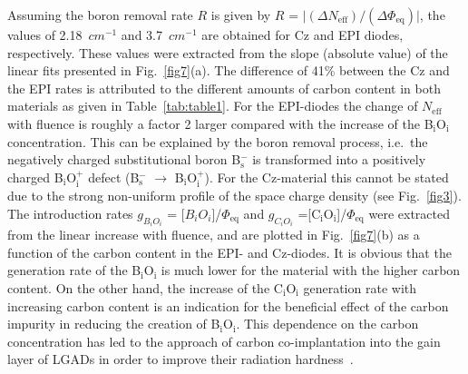 \documentclass[final, 5p, times]{elsarticle}
\begin{document}
Assuming the boron removal rate $R$ is given by $R$ = $\lvert (\Delta N_\text{eff})/ (\Delta \Phi_\text{eq}) \rvert$, the values of 2.18~$\si{cm^{-1}}$ and 3.7~$\si{cm^{-1}}$ are obtained for Cz and EPI diodes, respectively. These values were extracted from the slope (absolute value) of the linear fits presented in Fig.~\ref{fig7}(a). The difference of 41\% between the Cz and the EPI rates is attributed to the different amounts of carbon content in both materials as given in Table~\ref{tab:table1}. For the EPI-diodes the change of $N_\text{eff}$ with fluence is roughly a factor 2 larger compared with the increase of the B$_\text{i}$O$_\text{i}$ concentration. This can be explained by the boron removal process, i.e.\ the negatively charged substitutional boron B$^{-}_\text{s}$ is transformed into a positively charged B$_\text{i}$O$^{+}_\text{i}$ defect (B$^{-}_\text{s}$ $\rightarrow$ B$_\text{i}$O$^{+}_\text{i}$). For the Cz-material this cannot be stated due to the strong non-uniform profile of the space charge density (see Fig.~\ref{fig3}). The introduction rates $g_{B_i O_i}$ = [$B_i O_i$]/$\Phi_\text{eq}$ and $g_{C_i O_i}$ =[C$_\text{i}$O$_\text{i}$]/$\Phi_\text{eq}$ were extracted from the linear increase with fluence, and are plotted in Fig.~\ref{fig7}(b) as a function of the carbon content in the EPI- and Cz-diodes. It is obvious that the generation rate of the B$_\text{i}$O$_\text{i}$ is much lower for the material with the higher carbon content. On the other hand, the increase of the C$_\text{i}$O$_\text{i}$ generation rate with increasing carbon content is an indication for the beneficial effect of the carbon impurity in reducing the creation of B$_\text{i}$O$_\text{i}$. This dependence on the carbon concentration has led to the approach of carbon co-implantation into the gain layer of LGADs in order to improve their radiation hardness~\cite{b2}.
\end{document}
